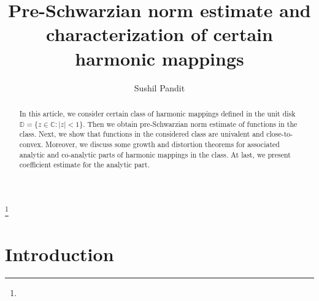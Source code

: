 \documentclass[a4paper,12pt]{amsart}
\theoremstyle{definition}
\newcounter{minutes}\setcounter{minutes}{\time}
\newcounter{hours}\setcounter{hours}{\time}
\begin{document}
	
	\title{Pre-Schwarzian norm estimate and characterization of certain harmonic mappings}
	
	
	\author{Sushil Pandit}
	\address{Sushil Pandit,
		Department of Mathematics,
		National Institute of Technology Meghalaya,
		Meghalaya-793108, India, Orcid Id-0000-0002-4129-6456}

	
	
	
	
	
	
	\def\thefootnote{}
	 \makeatletter\def\thefootnote{\@arabic\c@footnote}\makeatother
	
	
	
	\begin{abstract}
		In this article, we consider certain class of harmonic mappings defined in the unit disk $\mathbb{D}=\{z\in\mathbb{C}: |z|<1\}.$ Then we obtain pre-Schwarzian norm estimate of functions in the class. Next, we show that functions in the considered class are univalent and close-to-convex. Moreover, we discuss some growth and distortion theorems for associated analytic and co-analytic parts of harmonic mappings in the class. At last, we present coefficient estimate for the analytic part.
	\end{abstract}
	
	
	
	\thanks{}
	
	\maketitle
	\pagestyle{myheadings}
	
	\section{Introduction}
\end{document}

